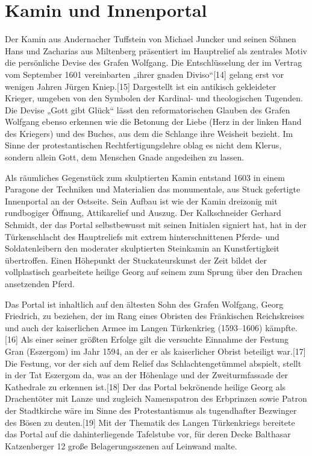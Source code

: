\documentclass[
  a4paper,
  openany]{book}
\begin{document}
\section{Kamin und Innenportal}\label{kamin-und-innenportal}

Der Kamin aus Andernacher Tuffstein von Michael Juncker und seinen
Söhnen Hans und Zacharias aus Miltenberg präsentiert im Hauptrelief als
zentrales Motiv die persönliche Devise des Grafen Wolfgang. Die
Entschlüsselung der im Vertrag vom September 1601 vereinbarten „ihrer
gnaden Diviso``{[}14{]} gelang erst vor wenigen Jahren Jürgen
Kniep.{[}15{]} Dargestellt ist ein antikisch gekleideter Krieger,
umgeben von den Symbolen der Kardinal- und theologischen Tugenden. Die
Devise „Gott gibt Glück`` lässt den reformatorischen Glauben des Grafen
Wolfgang ebenso erkennen wie die Betonung der Liebe (Herz in der linken
Hand des Kriegers) und des Buches, aus dem die Schlange ihre Weisheit
bezieht. Im Sinne der protestantischen Rechtfertigungslehre oblag es
nicht dem Klerus, sondern allein Gott, dem Menschen Gnade angedeihen zu
lassen.

Als räumliches Gegenstück zum skulptierten Kamin entstand 1603 in einem
Paragone der Techniken und Materialien das monumentale, aus Stuck
gefertigte Innenportal an der Ostseite. Sein Aufbau ist wie der Kamin
dreizonig mit rundbogiger Öffnung, Attikarelief und Auszug. Der
Kalkschneider Gerhard Schmidt, der das Portal selbstbewusst mit seinen
Initialen signiert hat, hat in der Türkenschlacht des Hauptreliefs mit
extrem hinterschnittenen Pferde- und Soldatenleibern den moderater
skulptierten Steinkamin an Kunstfertigkeit übertroffen. Einen Höhepunkt
der Stuckateurskunst der Zeit bildet der vollplastisch gearbeitete
heilige Georg auf seinem zum Sprung über den Drachen ansetzenden Pferd.

Das Portal ist inhaltlich auf den ältesten Sohn des Grafen Wolfgang,
Georg Friedrich, zu beziehen, der im Rang eines Obristen des Fränkischen
Reichskreises und auch der kaiserlichen Armee im Langen Türkenkrieg
(1593--1606) kämpfte.{[}16{]} Als einer seiner größten Erfolge gilt die
versuchte Einnahme der Festung Gran (Eszergom) im Jahr 1594, an der er
als kaiserlicher Obrist beteiligt war.{[}17{]} Die Festung, vor der sich
auf dem Relief das Schlachtengetümmel abspielt, stellt in der Tat
Eszergom da, was an der Höhenlage und der Zweiturmfassade der Kathedrale
zu erkennen ist.{[}18{]} Der das Portal bekrönende heilige Georg als
Drachentöter mit Lanze und zugleich Namenspatron des Erbprinzen sowie
Patron der Stadtkirche wäre im Sinne des Protestantismus als
tugendhafter Bezwinger des Bösen zu deuten.{[}19{]} Mit der Thematik des
Langen Türkenkriegs bereitete das Portal auf die dahinterliegende
Tafelstube vor, für deren Decke Balthasar Katzenberger 12 große
Belagerungsszenen auf Leinwand malte.
\end{document}
